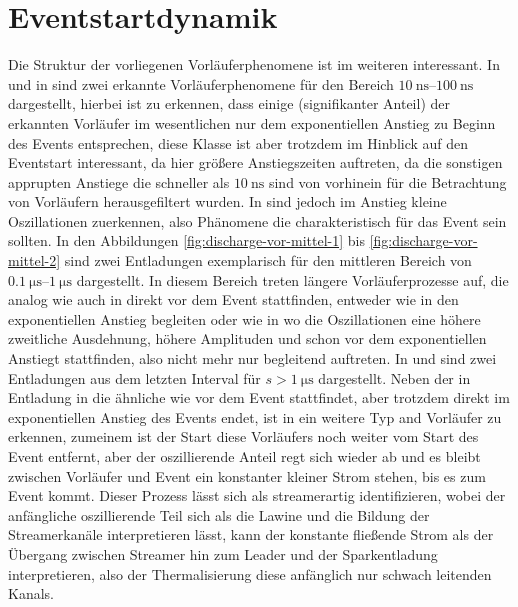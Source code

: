 \section{Eventstartdynamik}


Die Struktur der vorliegenen Vorläuferphenomene ist im weiteren interessant. In  und in  sind zwei erkannte Vorläuferphenomene für den Bereich \(\SIrange{10}{100}{\nano\second}\) dargestellt, hierbei ist zu erkennen, dass einige (signifikanter Anteil) der erkannten Vorläufer im wesentlichen nur dem exponentiellen Anstieg zu Beginn des Events entsprechen, diese Klasse ist aber trotzdem im Hinblick auf den Eventstart interessant, da hier größere Anstiegszeiten auftreten, da die sonstigen apprupten Anstiege die schneller als \(\SI{10}{\nano\second}\) sind von vorhinein für die Betrachtung von Vorläufern herausgefiltert wurden. In  sind jedoch im Anstieg kleine Oszillationen zuerkennen, also Phänomene die charakteristisch für das Event sein sollten. In den Abbildungen \ref{fig:discharge-vor-mittel-1} bis \ref{fig:discharge-vor-mittel-2} sind zwei Entladungen exemplarisch für den mittleren Bereich von \(\SIrange{0,1}{1}{\micro\second}\) dargestellt. In diesem Bereich treten längere Vorläuferprozesse auf, die analog wie auch in  direkt vor dem Event stattfinden, entweder wie in  den exponentiellen Anstieg begleiten oder wie in  wo die Oszillationen eine höhere zweitliche Ausdehnung, höhere Amplituden und schon vor dem exponentiellen Anstiegt stattfinden, also nicht mehr nur begleitend auftreten. In  und  sind zwei Entladungen aus dem letzten Interval für \(s > \SI{1}{\micro\second}\) dargestellt. Neben der in Entladung in  die ähnliche wie  vor dem Event stattfindet, aber trotzdem direkt im exponentiellen Anstieg des Events endet, ist in  ein weitere Typ and Vorläufer zu erkennen, zumeinem ist der Start diese Vorläufers noch weiter vom Start des Event entfernt, aber der oszillierende Anteil regt sich wieder ab und es bleibt zwischen Vorläufer und Event ein konstanter kleiner Strom stehen, bis es zum Event kommt. Dieser Prozess lässt sich als streamerartig identifizieren, wobei der anfängliche oszillierende Teil sich als die Lawine und die Bildung der Streamerkanäle interpretieren lässt, kann der konstante fließende Strom als der Übergang zwischen Streamer hin zum Leader und der Sparkentladung interpretieren, also der Thermalisierung diese anfänglich nur schwach leitenden Kanals.

